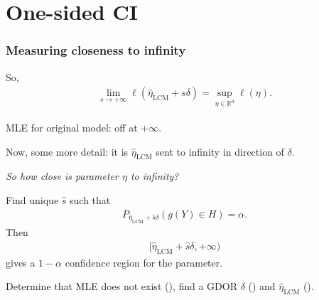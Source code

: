 \documentclass[ 10pt]{beamer}
\def\RR{{\mathbb R}}
\newcommand{\etaLCM}{\hat{\eta}_{\textrm{LCM}}}
\begin{document}
\section{One-sided CI}
\frame
{
  \frametitle{Measuring closeness to infinity}  
So,
\begin{align*}
	\lim_{s \to +\infty} \ell(\etaLCM + s\delta) = \sup_{\eta \in \RR^d} \ell(\eta).
\end{align*}	

MLE for original model: off at $+\infty$.

Now, some more detail: it is $\etaLCM$ sent to infinity in direction of $\delta$.
\vspace{2mm}


\emph{So how close is \alert{parameter} $\eta$ to infinity?  }
\vspace{2mm}

\pause
Find unique $\hat{s}$ such that
\begin{align*}
		P_{\etaLCM + \hat{s} \delta}( g(Y) \in H) = \alpha.
\end{align*}
\pause
Then
\begin{align*}
[ \etaLCM + \hat{s} \delta, + \infty)
\end{align*}
gives a $1 - \alpha$ confidence region for the parameter.
\vspace{2mm}

\pause
\begin{block}{}
Determine that MLE does not exist (\checkmark), find a GDOR $\delta$ (\checkmark) and $\etaLCM$ (\checkmark).
\end{block}
}

%
%
\end{document}
